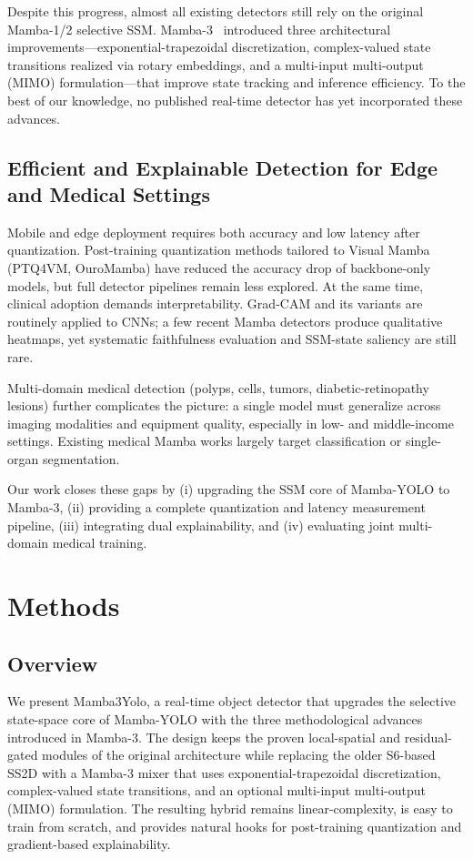 \documentclass[10pt,twocolumn,letterpaper]{article}
\begin{document}
Despite this progress, almost all existing detectors still rely on the original Mamba-1/2 selective SSM. Mamba-3~\cite{lahoti2026mamba3} introduced three architectural improvements—exponential-trapezoidal discretization, complex-valued state transitions realized via rotary embeddings, and a multi-input multi-output (MIMO) formulation—that improve state tracking and inference efficiency. To the best of our knowledge, no published real-time detector has yet incorporated these advances.

\subsection{Efficient and Explainable Detection for Edge and Medical Settings}
Mobile and edge deployment requires both accuracy and low latency after quantization. Post-training quantization methods tailored to Visual Mamba (PTQ4VM, OuroMamba) have reduced the accuracy drop of backbone-only models, but full detector pipelines remain less explored. At the same time, clinical adoption demands interpretability. Grad-CAM and its variants are routinely applied to CNNs; a few recent Mamba detectors produce qualitative heatmaps, yet systematic faithfulness evaluation and SSM-state saliency are still rare.

Multi-domain medical detection (polyps, cells, tumors, diabetic-retinopathy lesions) further complicates the picture: a single model must generalize across imaging modalities and equipment quality, especially in low- and middle-income settings. Existing medical Mamba works largely target classification or single-organ segmentation.

Our work closes these gaps by (i) upgrading the SSM core of Mamba-YOLO to Mamba-3, (ii) providing a complete quantization and latency measurement pipeline, (iii) integrating dual explainability, and (iv) evaluating joint multi-domain medical training.

\section{Methods}
\label{sec:methods}

\subsection{Overview}
We present Mamba3Yolo, a real-time object detector that upgrades the selective state-space core of Mamba-YOLO with the three methodological advances introduced in Mamba-3. The design keeps the proven local-spatial and residual-gated modules of the original architecture while replacing the older S6-based SS2D with a Mamba-3 mixer that uses exponential-trapezoidal discretization, complex-valued state transitions, and an optional multi-input multi-output (MIMO) formulation. The resulting hybrid remains linear-complexity, is easy to train from scratch, and provides natural hooks for post-training quantization and gradient-based explainability.
\end{document}
